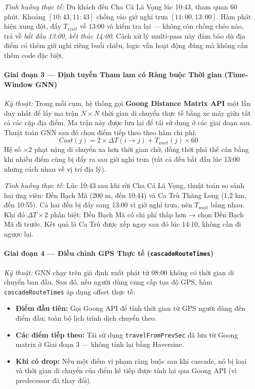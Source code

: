 \documentclass[12pt,a4paper]{article}
\begin{document}
\medskip
\textit{Tình huống thực tế:} Du khách đến Cha Cá Lã Vọng lúc 10:43, tham quan
60 phút. Khoảng $[10{:}43, 11{:}43]$ chồng vào giờ nghỉ trưa $[11{:}00, 13{:}00]$.
Hàm phát hiện xung đột, đẩy $T_{visit}$ về 13:00 và kiểm tra lại --- không còn
chồng chéo nào, trả về \textit{bắt đầu 13:00, kết thúc 14:00}. Cách xử lý
multi-pass này đảm bảo dù địa điểm có thêm giờ nghỉ riêng buổi chiều, logic vẫn
hoạt động đúng mà không cần thêm code đặc biệt.

\paragraph{Giai đoạn 3 --- Định tuyến Tham lam có Ràng buộc Thời gian (Time-Window GNN)}

\textit{Kỹ thuật:} Trong mỗi cụm, hệ thống gọi \textbf{Goong Distance Matrix
API} một lần duy nhất để lấy ma trận $N \times N$ thời gian di chuyển thực tế
bằng xe máy giữa tất cả các cặp địa điểm. Ma trận này được lưu lại để tái sử
dụng ở các giai đoạn sau. Thuật toán GNN sau đó chọn điểm tiếp theo theo hàm
chi phí:
\begin{equation}
  Cost(j) = 2 \times \Delta T(i \to j) + T_{wait}(j) \times 60
\end{equation}
Hệ số $\times 2$ phạt nặng di chuyển xa hơn thời gian chờ, đồng thời phá thế
cân bằng khi nhiều điểm cùng bị đẩy ra sau giờ nghỉ trưa (tất cả đều bắt đầu
lúc 13:00 nhưng cách nhau về vị trí địa lý).

\medskip
\textit{Tình huống thực tế:} Lúc 10:43 sau khi rời Cha Cá Lã Vọng, thuật toán
so sánh hai ứng viên: Đền Bạch Mã (200 m, đến 10:44) và Ca Trù Thăng Long
(1,2 km, đến 10:55). Cả hai đều bị đẩy sang 13:00 vì giờ nghỉ trưa, nên
$T_{wait}$ bằng nhau. Khi đó $\Delta T \times 2$ phân biệt: Đền Bạch Mã có chi
phí thấp hơn → chọn Đền Bạch Mã đi trước. Kết quả là Ca Trù được xếp ngay
sau đó lúc 14:10, không cần đi ngược lại.

\paragraph{Giai đoạn 4 --- Điều chỉnh GPS Thực tế (\texttt{cascadeRouteTimes})}

\textit{Kỹ thuật:} GNN chạy trên giả định xuất phát từ 08:00 không có thời gian
di chuyển ban đầu. Sau đó, nếu người dùng cung cấp tọa độ GPS, hàm
\texttt{cascadeRouteTimes} áp dụng offset thực tế:
\begin{itemize}
  \item \textbf{Điểm đầu tiên:} Gọi Goong API để tính thời gian từ GPS người
        dùng đến điểm đầu; toàn bộ lịch trình dịch chuyển theo.
  \item \textbf{Các điểm tiếp theo:} Tái sử dụng \texttt{travelFromPrevSec} đã
        lưu từ Goong matrix ở Giai đoạn 3 --- không tính lại bằng Haversine.
  \item \textbf{Khi có drop:} Nếu một điểm vi phạm ràng buộc sau khi cascade,
        nó bị loại và thời gian di chuyển của điểm kế tiếp được tính lại qua
        Goong API (vì predecessor đã thay đổi).
\end{itemize}
\end{document}
